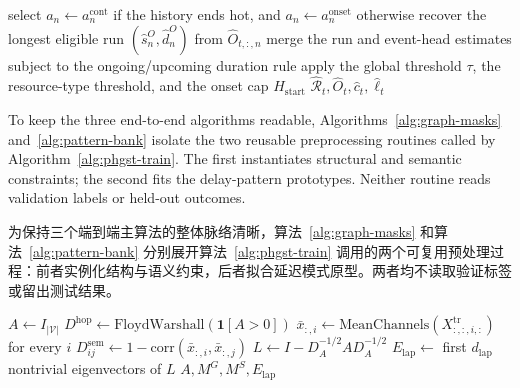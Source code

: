\documentclass[a4paper,fleqn]{cas-dc}
\newcommand{\zhpara}[1]{%
  \par\begingroup\small\color{black!72}\noindent #1\par\endgroup}
\begin{document}
\begin{algorithm*}[t]
{  select $a_n\leftarrow a^{\mathrm{cont}}_n$ if the history ends hot, and $a_n\leftarrow a^{\mathrm{onset}}_n$ otherwise\;
  recover the longest eligible run $(\hat s^{O}_n,\hat d^{O}_n)$ from $\hat O_{t,:,n}$\;
  merge the run and event-head estimates subject to the ongoing/upcoming duration rule\;
  apply the global threshold $\tau$, the resource-type threshold, and the onset cap $H_{\mathrm{start}}$\;
}
\Return $\widehat{\mathcal{R}}_t,\hat O_t,\hat c_t,\hat\ell_t$\;
\end{algorithm*}

To keep the three end-to-end algorithms readable, Algorithms~\ref{alg:graph-masks} and~\ref{alg:pattern-bank} isolate the two reusable preprocessing routines called by Algorithm~\ref{alg:phgst-train}. The first instantiates structural and semantic constraints; the second fits the delay-pattern prototypes. Neither routine reads validation labels or held-out outcomes.

\zhpara{为保持三个端到端主算法的整体脉络清晰，算法~\ref{alg:graph-masks} 和算法~\ref{alg:pattern-bank} 分别展开算法~\ref{alg:phgst-train} 调用的两个可复用预处理过程：前者实例化结构与语义约束，后者拟合延迟模式原型。两者均不读取验证标签或留出测试结果。}

\begin{algorithm}[t]
\caption{Factory graph and attention-mask construction.}
\label{alg:graph-masks}
$A\leftarrow I_{|\mathcal{V}|}$\;
$D^{\mathrm{hop}}\leftarrow\mathrm{FloydWarshall}(\mathbf{1}[A>0])$\;
$\bar x_{:,i}\leftarrow\mathrm{MeanChannels}(X^{\mathrm{tr}}_{:,:,i,:})$ for every $i$\;
$D^{\mathrm{sem}}_{ij}\leftarrow1-\mathrm{corr}(\bar x_{:,i},\bar x_{:,j})$\;
$L\leftarrow I-D_A^{-1/2}AD_A^{-1/2}$\;
$E_{\mathrm{lap}}\leftarrow$ first $d_{\mathrm{lap}}$ nontrivial eigenvectors of $L$\;
\Return $A,M^G,M^S,E_{\mathrm{lap}}$\;
\end{algorithm}
\end{document}
